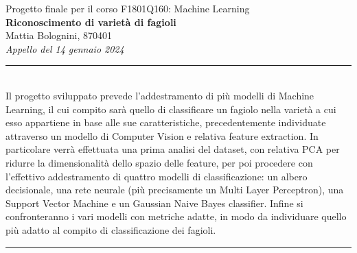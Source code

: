 \documentclass[a4paper,12pt]{article}
\renewenvironment{abstract}
 {\par\noindent\textbf{\abstractname}\ \ignorespaces \\}
 {\par\noindent\medskip}
\begin{document}
\pagestyle{fancy}
\thispagestyle{empty}
\fancyhead[L]{}
\renewcommand*{\thefootnote}{\fnsymbol{footnote}}
\begin{center}
\normalsize
Progetto finale per il corso F1801Q160: Machine Learning \\
\vspace{0.4cm}
\Large{\textbf{Riconoscimento di varietà di fagioli}}
\vspace{0.4cm}
\normalsize
\\ Mattia Bolognini, 870401 \\
\vspace{0.1cm}
\textit{Appello del 14 gennaio 2024}
\medskip
\normalsize
\end{center}
{\color{gray}\hrule}
\vspace{0.4cm}
\begin{abstract}
    Il progetto sviluppato prevede l'addestramento di più modelli di Machine
    Learning, il cui compito sarà quello di classificare un fagiolo nella 
    varietà a cui esso appartiene in base alle sue caratteristiche, precedentemente
    individuate attraverso un modello di Computer Vision e relativa
    feature extraction.
    In particolare verrà effettuata una prima analisi del dataset, con relativa
    PCA per ridurre la dimensionalità dello spazio delle feature, per poi
    procedere con l'effettivo addestramento di quattro modelli di 
    classificazione: un albero decisionale, una rete neurale 
    (più precisamente un Multi Layer Perceptron), una Support Vector Machine e
    un Gaussian Naive Bayes classifier.
    Infine si confronteranno i vari modelli con metriche adatte, in modo da
    individuare quello più adatto al compito di classificazione dei fagioli.
\end{abstract}
{\color{gray}\hrule}
\medskip

\begin{multicols}{2}
    \tableofcontents

    
    
    
    
    

    \printbibliography
\end{multicols}
\end{document}
